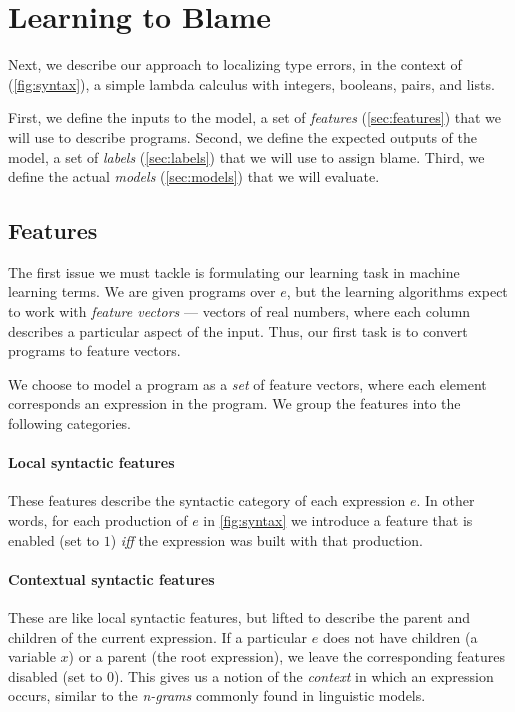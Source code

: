 \section{Learning to Blame}
\label{sec:learning}
Next, we describe our approach to localizing type errors, in the context
of \lang (\autoref{fig:syntax}), a simple lambda calculus with integers,
booleans, pairs, and lists.
%

%
First, we define the inputs to the model, a set of \emph{features}
(\autoref{sec:features}) that we will use to describe programs.
%
Second, we define the expected outputs of the model, a set of
\emph{labels} (\autoref{sec:labels}) that we will use to assign blame.
%
Third, we define the actual \emph{models} (\autoref{sec:models}) that we
will evaluate.

\subsection{Features}
\label{sec:features}
The first issue we must tackle is formulating our learning task in
machine learning terms.
%
We are given programs over $e$, but the learning algorithms expect to work
with \emph{feature vectors} --- vectors of real numbers, where each
column describes a particular aspect of the input.
%
Thus, our first task is to convert programs to feature vectors.

We choose to model a program as a \emph{set} of feature vectors, where
each element corresponds an expression in the program. We group the
features into the following categories.

\paragraph{Local syntactic features}
These features describe the syntactic category of each expression $e$.
%
In other words, for each production of $e$ in \autoref{fig:syntax} we
introduce a feature that is enabled (set to $1$) \emph{iff} the
expression was built with that production.

\paragraph{Contextual syntactic features}
These are like local syntactic features, but lifted to describe the
parent and children of the current expression.
%
If a particular $e$ does not have children (\eg a variable $x$) or a
parent (\ie the root expression), we leave the corresponding features
disabled (set to $0$).
%
This gives us a notion of the \emph{context} in which an expression
occurs, similar to the \emph{n-grams} commonly found in linguistic
models.

